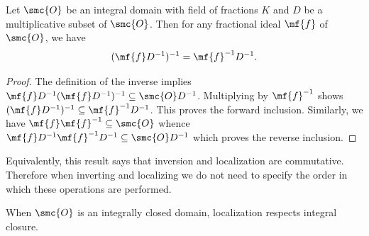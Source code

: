 \documentclass[12pt]{article}
\begin{document}
      \begin{proposition}\label{prop:inverse_of_localization_is_localization_of_inverse}
        Let \(\smc{O}\) be an integral domain with field of fractions \(K\) and \(D\) be a multiplicative subset of \(\smc{O}\). Then for any fractional ideal \(\mf{f}\) of \(\smc{O}\), we have
        \[
          (\mf{f}D^{-1})^{-1} = \mf{f}^{-1}D^{-1}.
        \]
      \end{proposition}
      \begin{proof}
        The definition of the inverse implies \(\mf{f}D^{-1}(\mf{f}D^{-1})^{-1} \subseteq \smc{O}D^{-1}\). Multiplying by \(\mf{f}^{-1}\) shows \((\mf{f}D^{-1})^{-1} \subseteq \mf{f}^{-1}D^{-1}\). This proves the forward inclusion. Similarly, we have \(\mf{f}\mf{f}^{-1} \subseteq \smc{O}\) whence \(\mf{f}D^{-1}\mf{f}^{-1}D^{-1} \subseteq \smc{O}D^{-1}\) which proves the reverse inclusion.
      \end{proof}

      Equivalently, this result says that inversion and localization are commutative. Therefore when inverting and localizing we do not need to specify the order in which these operations are performed.

      When \(\smc{O}\) is an integrally closed domain, localization respects integral closure.
\end{document}

